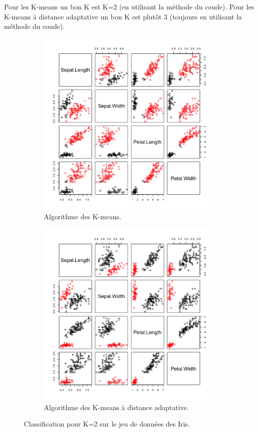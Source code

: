 \documentclass[a4paper,11pt,oneside,roman]{article}
\begin{document}
    Pour les K-means un bon K est K=2 (en utilisant la méthode du coude).
    Pour les K-means à distance adaptative un bon K est plutôt 3 (toujours en utilisant la méthode du coude).

    \begin{figure}
        \centering
        \begin{subfigure}{.5\textwidth}
          \centering
          \includegraphics[width=.8\linewidth]{imgs/K_means_iris_2.png}
          \caption{Algorithme des K-means.}
        \end{subfigure}%
        \begin{subfigure}{.5\textwidth}
          \centering
          \includegraphics[width=.8\linewidth]{imgs/K_means_adapt_iris_2.png}
          \caption{Algorithme des K-means à distance adaptative.}
        \end{subfigure}
        \caption{Classification pour K=2 sur le jeu de données des Iris.}
        \label{fig_Iris_2}
    \end{figure}
    
\end{document}
